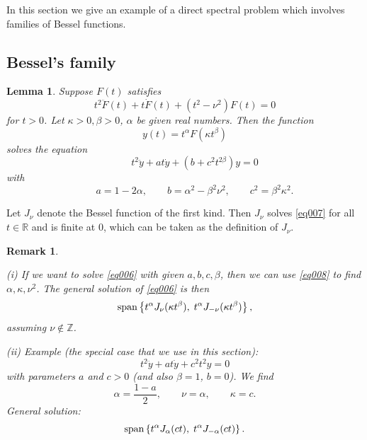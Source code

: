 \documentclass[11pt,twoside,reqno]{amsart}
\def\ms{\bigskip}
\def\ms{\medskip}
\def\no{\noindent}
\def\R{{\mathbb R}}
\def\Z{{\mathbb{Z}}}
\theoremstyle{plain}
\newtheorem{lemma}{Lemma}
\newtheorem{remark}{Remark}
\numberwithin{equation}{section}
\begin{document}
In this section we give an example of a direct spectral problem which involves families of Bessel functions.



\ms\subsection{Bessel's family}


\begin{lemma} Suppose $F(t)$ satisfies 
\begin{equation}t^2\ddot F(t)+t\dot F(t)+(t^2-\nu^2)F(t)=0\label{eq007}\end{equation}
for $t>0$. Let $\kappa>0, \beta>0$, $\alpha$ be given real numbers. Then the function
$$y(t)=t^\alpha F(\kappa t^\beta) $$
solves the equation
\begin{equation}\qquad t^2 \ddot y+at\dot y+(b+c^2t^{2\beta})y=0\label{eq006}\end{equation}
with
\begin{equation}\qquad a=1-2\alpha,\qquad  b=\alpha^2-\beta^2\nu^2, \qquad c^2=\beta^2\kappa^2.\label{eq008}\end{equation}
\end{lemma}



Let $J_\nu$ denote the Bessel function of the first kind. Then $J_\nu$ solves \eqref{eq007} for all $t\in \R$ and is finite at $0$, which can be taken as the definition of $J_\nu$.


\begin{remark}
$\ $

(i) If we want to solve  \eqref{eq006} with given $a, b, c, \beta$, then we can use \eqref{eq008} to find $\alpha, \kappa, \nu^2$. The general solution of \eqref{eq006} is then
$${\rm span} \left\{t^\alpha J_\nu(\kappa t^\beta),\;
t^\alpha J_{-\nu}(\kappa t^\beta)\right\},$$
assuming $\nu\not\in\Z$.

\ms\no(ii)  Example (the special case that we use in this section):
$$t^2\ddot y+at\dot y+c^2t^2 y=0$$
with parameters $a$ and $c>0$ (and also  $\beta=1$, $b=0$).  We find 
$$\alpha=\frac{1-a}2,\qquad \nu=\alpha,\qquad \kappa=c.$$ General solution:
$${\rm span} \left\{t^\alpha J_\alpha(c t),\;
t^\alpha J_{-\alpha}(c t)\right\}.$$




\end{remark}
\end{document}
